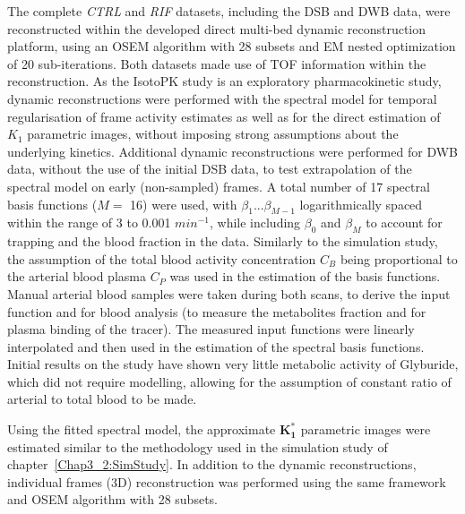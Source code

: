 The complete \textit{CTRL} and \textit{RIF} datasets, including the DSB and DWB data, were reconstructed within the developed direct multi-bed dynamic reconstruction platform, using an OSEM algorithm with 28 subsets and EM nested optimization of 20 sub-iterations. Both datasets made use of TOF information within the reconstruction. 
As the IsotoPK study is an exploratory pharmacokinetic study, dynamic reconstructions were performed with the spectral model for temporal regularisation of frame activity estimates as well as for the direct estimation of $K_1$ parametric images, without imposing strong assumptions about the underlying kinetics.
Additional dynamic reconstructions were performed for DWB data, without the use of the initial DSB data, to test extrapolation of the spectral model on early (non-sampled) frames. 
A total number of 17 spectral basis functions ($M=$ 16) were used, with $\beta_1 ... \beta_{M-1}$ logarithmically spaced within the range of 3 to 0.001 $min^{-1}$, while including $\beta_0$ and $\beta_{M}$ to account for trapping and the blood fraction in the data. Similarly to the simulation study, the assumption of the total blood activity concentration $C_{B}$ being proportional to the arterial blood plasma $C_{P}$ was used in the estimation of the basis functions.
Manual arterial blood samples were taken during both scans, to derive the input function and for blood analysis (to measure the metabolites fraction and for plasma binding of the tracer). The measured input functions were linearly interpolated and then used in the estimation of the spectral basis functions. 
Initial results on the study have shown very little metabolic activity of Glyburide, which did not require modelling, allowing for the assumption of constant ratio of arterial to total blood to be made.

Using the fitted spectral model, the approximate $\boldsymbol{K_1^*}$ parametric images were estimated similar to the methodology used in the simulation study of chapter~\ref{Chap3_2:SimStudy}.
In addition to the dynamic reconstructions, individual frames (3D) reconstruction was performed using the same framework and OSEM algorithm with 28 subsets.

